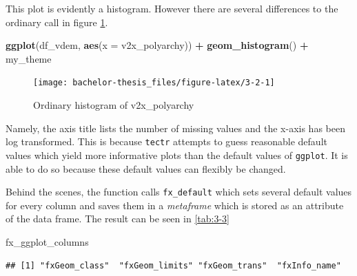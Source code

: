 \documentclass[]{report}
\newenvironment{Shaded}{\begin{snugshade}}{\end{snugshade}}
\newcommand{\KeywordTok}[1]{\textcolor[rgb]{0.13,0.29,0.53}{\textbf{#1}}}
\newcommand{\DataTypeTok}[1]{\textcolor[rgb]{0.13,0.29,0.53}{#1}}
\newcommand{\StringTok}[1]{\textcolor[rgb]{0.31,0.60,0.02}{#1}}
\newcommand{\OperatorTok}[1]{\textcolor[rgb]{0.81,0.36,0.00}{\textbf{#1}}}
\newcommand{\NormalTok}[1]{#1}
\theoremstyle{definition}
\theoremstyle{definition}
\theoremstyle{definition}
\theoremstyle{remark}
\begin{document}
This plot is evidently a histogram. However there are several
differences to the ordinary call in figure \ref{fig:3-2}.

\begin{Shaded}
\begin{Highlighting}[]
\KeywordTok{ggplot}\NormalTok{(df_vdem, }\KeywordTok{aes}\NormalTok{(}\DataTypeTok{x =}\NormalTok{ v2x_polyarchy)) }\OperatorTok{+}\StringTok{ }
\StringTok{  }\KeywordTok{geom_histogram}\NormalTok{() }\OperatorTok{+}\StringTok{ }
\StringTok{  }\NormalTok{my_theme}
\end{Highlighting}
\end{Shaded}

\begin{figure}

{\centering \texttt{[image: bachelor-thesis\_files/figure-latex/3-2-1]} 

}

\caption{Ordinary histogram of v2x\_polyarchy}\label{fig:3-2}
\end{figure}



Namely, the axis title lists the number of missing values and the x-axis
has been log transformed. This is because \texttt{tectr} attempts to
guess reasonable default values which yield more informative plots than
the default values of \texttt{ggplot}. It is able to do so because these
default values can flexibly be changed.

Behind the scenes, the function calls \texttt{fx\_default} which sets
several default values for every column and saves them in a
\emph{metaframe} which is stored as an attribute of the data frame. The
result can be seen in \ref{tab:3-3}

\begin{Shaded}
\begin{Highlighting}[]
\NormalTok{fx_ggplot_columns}
\end{Highlighting}
\end{Shaded}

\begin{verbatim}
## [1] "fxGeom_class"  "fxGeom_limits" "fxGeom_trans"  "fxInfo_name"
\end{verbatim}

\begin{Shaded}
\end{Shaded}
\end{document}
